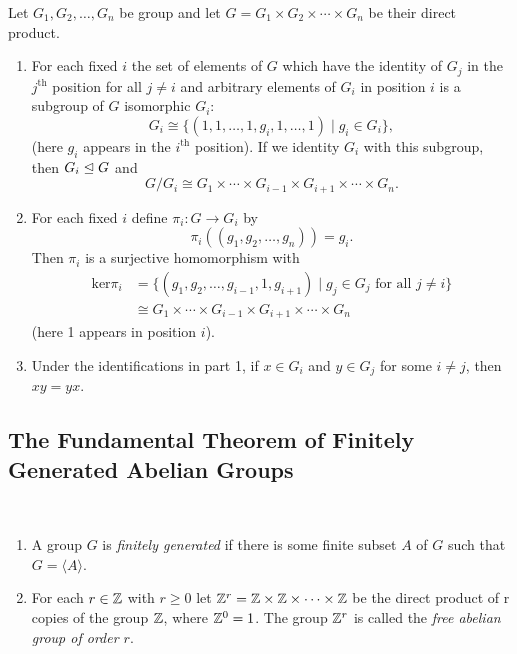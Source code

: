 \documentclass[../main]{subfiles}
\begin{document}
\begin{prop}
 Let $G_1, G_2, \ldots , G_n$ be group and let $G = G_1 \times G_2 \times \cdots \times G_n$ be their direct product.
 \begin{enumerate}
  \item For each fixed $i$ the set of elements of $G$ which have the identity of $G_j$ in the $j^{\text{th}}$ position for all $j \neq i$ and arbitrary elements of $G_i$ in position $i$ is a subgroup of $G$ isomorphic $G_i$:
  \[G_i \cong \{(1,1,\ldots, 1, g_i,1,\ldots, 1) \mid g_i\in G_i\},\]
  (here $g_i$ appears in the $i^{\text{th}}$ position). If we identity $G_i$ with this subgroup, then $G_i \trianglelefteq G$ and 
  \[G/G_i \cong G_1\times \cdots \times G_{i-1} \times G_{i+1} \times \cdots \times G_n.\]
  \item For each fixed $i$ define $\pi_i \colon G \to G_i$ by 
  \[\pi_i((g_1,g_2,\ldots,g_n)) = g_i.\]
  Then $\pi_i$ is a surjective homomorphism with
  \begin{align*}
   \text{ker}\pi_i &= \{(g_1,g_2, \ldots , g_{i-1}, 1, g_{i+1}) \mid g_j \in G_j \text{ for all } j\neq i\} \\
   &\cong G_1\times \cdots \times G_{i-1} \times G_{i+1} \times \cdots \times G_n
  \end{align*}
  (here 1 appears in position $i$).
  \item Under the identifications in part 1, if $x \in G_i$ and $y\in G_j$ for some $i \neq j$, then $xy = yx$. 
 \end{enumerate}
\end{prop}


\subsection{The Fundamental Theorem of Finitely Generated Abelian Groups}


\begin{dfn}
 ~\begin{enumerate}
   \item A group $G$ is \textit{finitely generated} if there is some finite subset $A$ of $G$ such that $G = \langle A \rangle$.
   \item For each $r\in \mathbb{Z}$ with $r \geq 0$ let $\mathbb{Z}^r = \mathbb{Z} \times \mathbb{Z} \times \cdots \times \mathbb{Z}$ be the direct product of r copies of the group $\mathbb{Z}$, where $\mathbb{Z}^0 = 1$. The group $\mathbb{Z}^r$ is called the \textit{free abelian group of order $r$}.
  \end{enumerate}
\end{dfn}
\end{document}
